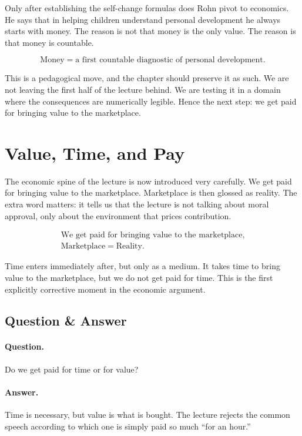 Only after establishing the self-change formulas does Rohn pivot to economics. He says that in helping children understand personal development he always starts with money. The reason is not that money is the only value. The reason is that money is countable.

\begin{equation}
\text{Money}=\text{a first countable diagnostic of personal development}.
\end{equation}

This is a pedagogical move, and the chapter should preserve it as such. We are not leaving the first half of the lecture behind. We are testing it in a domain where the consequences are numerically legible. Hence the next step: we get paid for bringing value to the marketplace.

\section{Value, Time, and Pay}

The economic spine of the lecture is now introduced very carefully. We get paid for bringing value to the marketplace. Marketplace is then glossed as reality. The extra word matters: it tells us that the lecture is not talking about moral approval, only about the environment that prices contribution.

\begin{align}
\text{We get paid for bringing value to the marketplace},\\
\text{Marketplace}=\text{Reality}.
\end{align}

Time enters immediately after, but only as a medium. It takes time to bring value to the marketplace, but we do not get paid for time. This is the first explicitly corrective moment in the economic argument.

\subsection{Question \& Answer}

\paragraph{Question.} Do we get paid for time or for value?

\paragraph{Answer.} Time is necessary, but value is what is bought. The lecture rejects the common speech according to which one is simply paid so much ``for an hour.''

